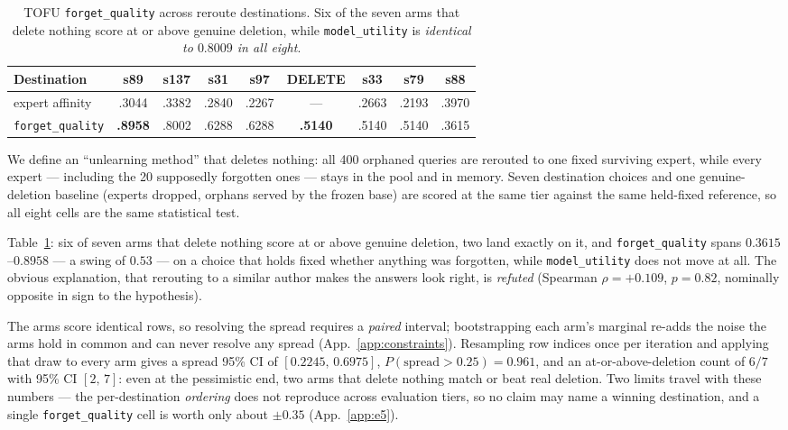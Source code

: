 \documentclass{article}
\newcommand{\fq}{\texttt{forget\_quality}}
\newcommand{\util}{\texttt{model\_utility}}
\begin{document}
\begin{table}[t]
  \caption{TOFU \fq{} across reroute destinations. Six of the seven arms that delete nothing score
  at or above genuine deletion, while \util{} is \emph{identical to $0.8009$ in all eight}.}
  \label{tab:e5}
  \centering
  \small
  \begin{tabular}{@{}lcccccccc@{}}
    \toprule
    Destination & s89 & s137 & s31 & s97 & \textbf{DELETE} & s33 & s79 & s88 \\
    \midrule
    expert affinity & .3044 & .3382 & .2840 & .2267 & --- & .2663 & .2193 & .3970 \\
    \fq{}           & \textbf{.8958} & .8002 & .6288 & .6288 & \textbf{.5140} & .5140 & .5140 & .3615 \\
    \bottomrule
  \end{tabular}
\end{table}

We define an ``unlearning method'' that deletes nothing: all 400 orphaned queries are rerouted to
one fixed surviving expert, while every expert --- including the 20 supposedly forgotten ones ---
stays in the pool and in memory. Seven destination choices and one genuine-deletion baseline
(experts dropped, orphans served by the frozen base) are scored at the same tier against the same
held-fixed reference, so all eight cells are the same statistical test.

Table~\ref{tab:e5}: six of seven arms that delete nothing score at or above genuine deletion, two
land exactly on it, and \fq{} spans $0.3615$--$0.8958$ --- a swing of $0.53$ --- on a choice that
holds fixed whether anything was forgotten, while \util{} does not move at all. The obvious
explanation, that rerouting to a similar author makes the answers look right, is \emph{refuted}
(Spearman $\rho = +0.109$, $p=0.82$, nominally opposite in sign to the hypothesis).

The arms score identical rows, so resolving the spread requires a \emph{paired} interval;
bootstrapping each arm's marginal re-adds the noise the arms hold in common and can never resolve
any spread (App.~\ref{app:constraints}). Resampling row indices once per iteration and applying
that draw to every arm gives a spread 95\% CI of $[0.2245,\,0.6975]$, $P(\text{spread} > 0.25) =
0.961$, and an at-or-above-deletion count of $6/7$ with 95\% CI $[2,\,7]$: even at the pessimistic
end, two arms that delete nothing match or beat real deletion. Two limits travel with these numbers
--- the per-destination \emph{ordering} does not reproduce across evaluation tiers, so no claim may
name a winning destination, and a single \fq{} cell is worth only about $\pm 0.35$
(App.~\ref{app:e5}).
\end{document}
